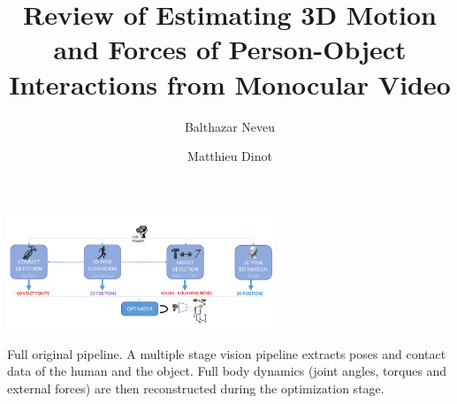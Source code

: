 \documentclass[sigconf, nonacm]{acmart}
\title{Review of Estimating 3D Motion and Forces of Person-Object Interactions from Monocular Video}
\author{Balthazar Neveu}
\affiliation{%
  \institution{ENS Paris-Saclay}
  \city{Saclay}
  \country{France}
}
\author{Matthieu Dinot}
\affiliation{%
  \institution{Ecole Polytechnique}
  \city{Palaiseau}
  \country{France}
}
\begin{document}

  \begin{teaserfigure}
    \includegraphics[width=0.6\textwidth]{figures/authors_original_pipeline.png}
    \centering
    \caption{Full original pipeline. 
    A multiple stage vision pipeline extracts poses and contact data of the human and the object.
    Full body dynamics (joint angles, torques and external forces) are then reconstructed during the optimization stage.
    }
    \label{fig:original_pipeline}
  \end{teaserfigure}

  \maketitle




  
  
  
  
  

  \newpage

  \appendix
  
  
  
  
\end{document}
